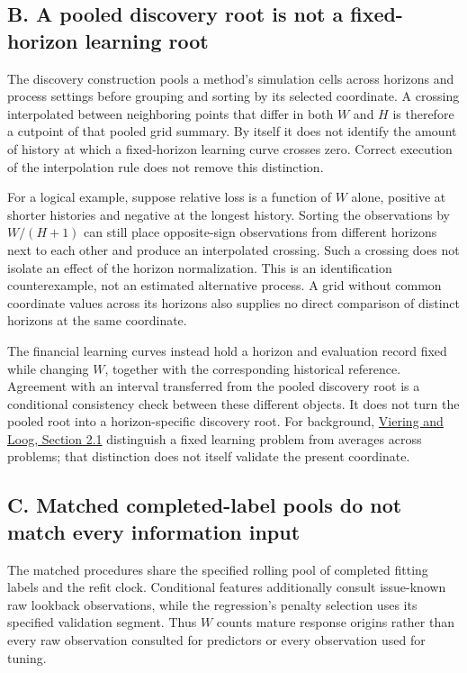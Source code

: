\subsection*{B. A pooled discovery root is not a fixed-horizon learning root}

The discovery construction pools a method's simulation cells across horizons
and process settings before grouping and sorting by its selected coordinate.
A crossing interpolated between neighboring points that differ in both \(W\)
and \(H\) is therefore a cutpoint of that pooled grid summary. By itself it
does not identify the amount of history at which a fixed-horizon learning
curve crosses zero. Correct execution of the interpolation rule does not
remove this distinction.

For a logical example, suppose relative loss is a function of \(W\) alone,
positive at shorter histories and negative at the longest history. Sorting
the observations by \(W/(H+1)\) can still place opposite-sign observations
from different horizons next to each other and produce an interpolated
crossing. Such a crossing does not isolate an effect of the horizon
normalization. This is an identification counterexample, not an estimated
alternative process. A grid without common coordinate values across its
horizons also supplies no direct comparison of distinct horizons at the same
coordinate.

The financial learning curves instead hold a horizon and evaluation record
fixed while changing \(W\), together with the corresponding historical
reference. Agreement with an interval transferred from the pooled discovery
root is a conditional consistency check between these different objects.
It does not turn the pooled root into a horizon-specific discovery root.
For background, \href{https://arxiv.org/pdf/2103.10948}{Viering and Loog,
Section 2.1} distinguish a fixed learning problem from averages across
problems; that distinction does not itself validate the present coordinate.

\subsection*{C. Matched completed-label pools do not match every information input}

The matched procedures share the specified rolling pool of completed fitting
labels and the refit clock. Conditional features additionally consult
issue-known raw lookback observations, while the regression's penalty
selection uses its specified validation segment. Thus \(W\) counts mature
response origins rather than every raw observation consulted for predictors
or every observation used for tuning.

